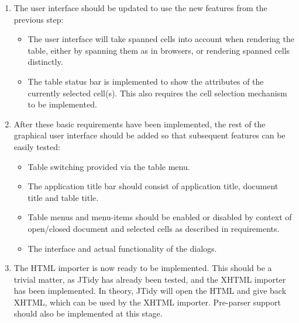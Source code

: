 \begin{enumerate}
\item The user interface should be updated to use the new features from the previous
step:

\begin{itemize}

\item The user interface will take spanned cells into account when rendering
the table, either by spanning them as in browsers, or rendering spanned cells
distinctly.

\item The table status bar is implemented to show the attributes of the currently
selected cell(s). This also requires the cell selection mechanism to be implemented.

\end{itemize}

\item After these basic requirements have been implemented, the rest of the graphical
user interface should be added so that subsequent features can be easily tested:

\begin{itemize}


\item Table switching provided via the table menu.

\item The application title bar should consist of application title, document title and table title.

\item Table menus and menu-items should be enabled or disabled by context of open/closed document
and selected cells as described in requirements.

\item The interface and actual functionality of the dialogs.



\end{itemize}

\item The HTML importer is now ready to be implemented. This should be a
trivial matter, as JTidy has already been tested, and the XHTML importer has
been implemented. In theory, JTidy will open the HTML and give back XHTML,
which can be used by the XHTML importer. Pre-parser support should also be
implemented at this stage. 


\end{enumerate}
